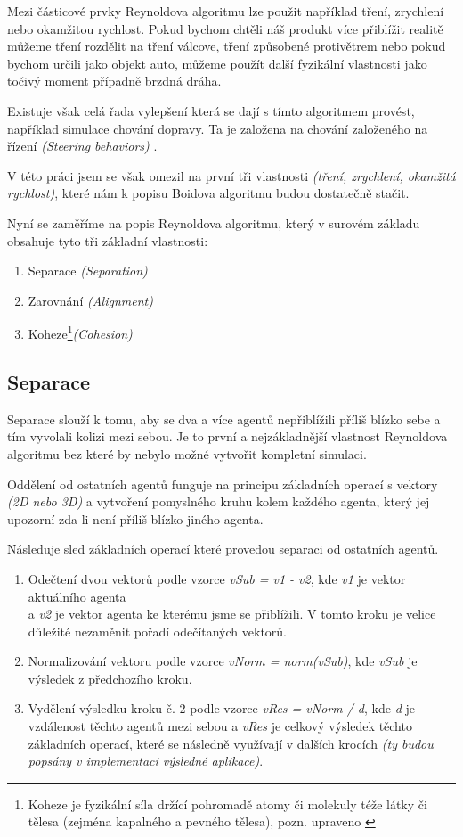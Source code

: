 \documentclass[czech,public,dept460,male,cpdeclaration]{diploma}
\begin{document}
Mezi částicové prvky Reynoldova algoritmu lze použit například tření, zrychlení nebo okamžitou rychlost. Pokud bychom chtěli náš produkt více přiblížit realitě můžeme tření rozdělit na tření válcove, tření způsobené protivětrem nebo pokud bychom určili jako objekt auto, můžeme použít další fyzikální vlastnosti jako točivý moment případně brzdná dráha.

Existuje však celá řada vylepšení která se dají s tímto algoritmem provést, například simulace chování dopravy. Ta je založena na chování založeného na řízení \textit{(Steering behaviors)} \cite{linkToSteeringBehaviors}. 

V této práci jsem se však omezil na první tři vlastnosti \textit{(tření, zrychlení, okamžitá rychlost)}, které nám k popisu Boidova algoritmu budou dostatečně stačit.

\newpage
Nyní se zaměříme na popis Reynoldova algoritmu, který v surovém základu obsahuje tyto tři základní vlastnosti:

\begin{enumerate}
	\item Separace \textit{(Separation)}
	\item Zarovnání \textit{(Alignment)}
	\item Koheze\footnote{Koheze je fyzikální síla držící pohromadě atomy či molekuly téže látky či tělesa (zejména
		kapalného a pevného tělesa), pozn. upraveno \cite{linkToCohesion}}\textit{(Cohesion)}
\end{enumerate}

\subsection{Separace}
Separace slouží k tomu, aby se dva a více agentů nepřiblížili příliš blízko sebe a tím vyvolali kolizi mezi sebou. Je to první a nejzákladnější vlastnost Reynoldova algoritmu bez které by nebylo možné vytvořit kompletní simulaci. 

Oddělení od ostatních agentů funguje na principu základních operací s vektory \textit{(2D nebo 3D)} a vytvoření pomyslného kruhu kolem každého agenta, který jej upozorní zda-li není příliš blízko jiného agenta. 

Následuje sled základních operací které provedou separaci od ostatních agentů. 

\begin{enumerate}
	\item Odečtení dvou vektorů podle vzorce \textit{vSub = v1 - v2}, kde \textit{v1} je vektor aktuálního agenta\\ a \textit{v2} je vektor agenta ke kterému jsme se přiblížili. V tomto kroku je velice důležité nezaměnit pořadí odečítaných vektorů.
	\item Normalizování vektoru podle vzorce \textit{vNorm = norm(vSub)}, kde \textit{vSub} je výsledek z předchozího kroku.
	\item Vydělení výsledku kroku č. 2 podle vzorce \textit{vRes = vNorm / d}, kde \textit{d} je vzdálenost těchto agentů mezi sebou a \textit{vRes} je celkový výsledek těchto základních operací, které se následně využívají v dalších krocích \textit{(ty budou popsány v implementaci výsledné aplikace)}.
\end{enumerate}
\end{document}
